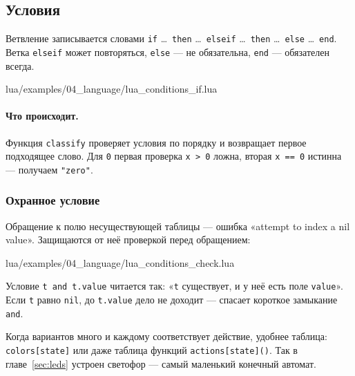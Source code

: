 \subsection{Условия}

Ветвление записывается словами \texttt{if} \dots\ \texttt{then} \dots\ \texttt{elseif} \dots\ \texttt{then} \dots\ \texttt{else} \dots\ \texttt{end}. Ветка \verb|elseif| может повторяться, \verb|else| --- не обязательна, \verb|end| --- обязателен всегда.

\begin{codefile}{lua/examples/04_language/lua_conditions_if.lua}
\end{codefile}

\paragraph{Что происходит.} Функция \verb|classify| проверяет условия по порядку и возвращает первое подходящее слово. Для \verb|0| первая проверка \verb|x > 0| ложна, вторая \verb|x == 0| истинна --- получаем \verb|"zero"|.

\subsubsection*{Охранное условие}

Обращение к полю несуществующей таблицы --- ошибка «attempt to index a nil value». Защищаются от неё проверкой перед обращением:

\begin{codefile}{lua/examples/04_language/lua_conditions_check.lua}
\end{codefile}

Условие \verb|t and t.value| читается так: «\verb|t| существует, и у неё есть поле \verb|value|». Если \verb|t| равно \verb|nil|, до \verb|t.value| дело не доходит --- спасает короткое замыкание \verb|and|.

\begin{hintbox}
Когда вариантов много и каждому соответствует действие, удобнее таблица: \verb|colors[state]| или даже таблица функций \verb|actions[state]()|. Так в главе~\ref{sec:leds} устроен светофор --- самый маленький конечный автомат.
\end{hintbox}

